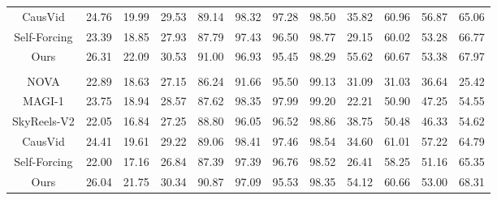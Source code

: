 \begin{table}[h]
{\begin{tabular}{cgrrgrrrrgrr}
CausVid & 24.76 & 19.99 & 29.53 & 89.14 & 98.32 & 97.28 & 98.50 & 35.82 & 60.96 & 56.87 & 65.06 \\
Self-Forcing & 23.39 & 18.85 & 27.93 & 87.79 & 97.43 & 96.50 & 98.77 & 29.15 & 60.02 & 53.28 & 66.77 \\
Ours & 26.31 & 22.09 & 30.53 & 91.00 & 96.93 & 95.45 & 98.29 & 55.62 & 60.67 & 53.38 & 67.97 \\
\midrule
{}
     \\
NOVA & 22.89 & 18.63 & 27.15 & 86.24 & 91.66 & 95.50 & 99.13 & 31.09 & 31.03 & 36.64 & 25.42 \\
MAGI-1 & 23.75 & 18.94 & 28.57 & 87.62 & 98.35 & 97.99 & 99.20 & 22.21 & 50.90 & 47.25 & 54.55 \\
SkyReels-V2 & 22.05 & 16.84 & 27.25 & 88.80 & 96.05 & 96.52 & 98.86 & 38.75 & 50.48 & 46.33 & 54.62 \\
CausVid & 24.41 & 19.61 & 29.22 & 89.06 & 98.41 & 97.46 & 98.54 & 34.60 & 61.01 & 57.22 & 64.79 \\
Self-Forcing & 22.00 & 17.16 & 26.84 & 87.39 & 97.39 & 96.76 & 98.52 & 26.41 & 58.25 & 51.16 & 65.35 \\
Ours & 26.04 & 21.75 & 30.34 & 90.87 & 97.09 & 95.53 & 98.35 & 54.12 & 60.66 & 53.00 & 68.31 \\
\bottomrule
\end{tabular}
}
\label{tab:detailed_results}
\end{table}
